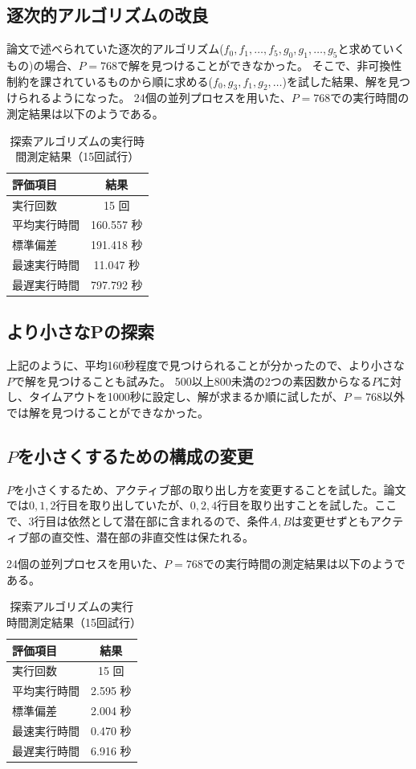 \documentclass[a4paper,11pt,dvipdfmx]{jsarticle}
\theoremstyle{definition}
\begin{document}
\subsection{逐次的アルゴリズムの改良}
論文で述べられていた逐次的アルゴリズム($f_0, f_1, \dots, f_5, g_0, g_1, \dots, g_5$と求めていくもの)の場合、$P = 768$で解を見つけることができなかった。
そこで、非可換性制約を課されているものから順に求める($f_0, g_3, f_1, g_2, \dots$)を試した結果、解を見つけられるようになった。
24個の並列プロセスを用いた、$P=768$での実行時間の測定結果は以下のようである。
\begin{table}[htb]
  \centering
  \caption{探索アルゴリズムの実行時間測定結果（15回試行）}
  \begin{tabular}{lc}
    \hline
    \textbf{評価項目} & \textbf{結果} \\
    \hline
    実行回数 & 15 回 \\
    平均実行時間 & 160.557 秒 \\
    標準偏差 & 191.418 秒 \\
    最速実行時間 & 11.047 秒 \\
    最遅実行時間 & 797.792 秒 \\
    \hline
  \end{tabular}
\end{table}

\subsection{より小さなPの探索}
上記のように、平均160秒程度で見つけられることが分かったので、より小さな$P$で解を見つけることも試みた。
500以上800未満の2つの素因数からなる$P$に対し、タイムアウトを1000秒に設定し、解が求まるか順に試したが、$P=768$以外では解を見つけることができなかった。

\subsection{$P$を小さくするための構成の変更}
$P$を小さくするため、アクティブ部の取り出し方を変更することを試した。論文では$0,1,2$行目を取り出していたが、$0,2,4$行目を取り出すことを試した。ここで、$3$行目は依然として潜在部に含まれるので、条件$A,B$は変更せずともアクティブ部の直交性、潜在部の非直交性は保たれる。

24個の並列プロセスを用いた、$P=768$での実行時間の測定結果は以下のようである。
\begin{table}[htb]
  \centering
  \caption{探索アルゴリズムの実行時間測定結果（15回試行）}
  \begin{tabular}{lc}
    \hline
    \textbf{評価項目} & \textbf{結果} \\
    \hline
    実行回数 & 15 回 \\
    平均実行時間 & 2.595 秒 \\
    標準偏差 & 2.004 秒 \\
    最速実行時間 & 0.470 秒 \\
    最遅実行時間 & 6.916 秒 \\
    \hline
  \end{tabular}
\end{table}
\end{document}
